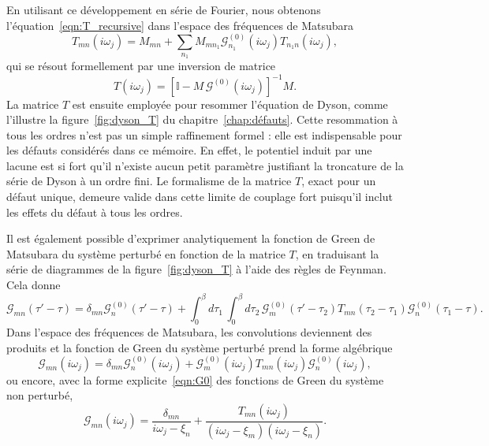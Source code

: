 En utilisant ce développement en série de Fourier, nous obtenons l'équation~\eqref{eqn:T_recursive} dans l'espace des fréquences de Matsubara
\begin{equation}
    T_{mn}(i\omega_j) = M_{mn}+\sum_{n_1}M_{mn_1}\mathcal{G}^{(0)}_{n_1}(i\omega_j)T_{n_1n}(i\omega_j),
    \label{eqn:T_indices}
\end{equation}
qui se résout formellement par une inversion de matrice
\begin{equation}
    T(i\omega_j) = \left[\mathbb{I}-M\,\mathcal{G}^{(0)}(i\omega_j)\right]^{-1}M.
    \label{eqn:T_fermee}
\end{equation}
La matrice $T$ est ensuite employée pour resommer l'équation de Dyson, comme l'illustre la figure~\ref{fig:dyson_T} du chapitre~\ref{chap:défauts}.
Cette resommation à tous les ordres n'est pas un simple raffinement formel : elle est indispensable pour les défauts considérés dans ce mémoire. En effet, le potentiel induit par une lacune est si fort qu'il n'existe aucun petit paramètre justifiant la troncature de la série de Dyson à un ordre fini. Le formalisme de la matrice $T$, exact pour un défaut unique, demeure valide dans cette limite de couplage fort puisqu'il inclut les effets du défaut à tous les ordres.

Il est également possible d'exprimer analytiquement la fonction de Green de Matsubara du système perturbé en fonction de la matrice $T$, en traduisant la série de diagrammes de la figure~\ref{fig:dyson_T} à l'aide des règles de Feynman. Cela donne
\begin{equation}
    \mathcal{G}_{mn}(\tau'-\tau) = \delta_{mn}\mathcal{G}^{(0)}_n(\tau'-\tau) + \int_0^\beta d\tau_1\,\int_0^\beta d\tau_2\,\mathcal{G}^{(0)}_m(\tau'-\tau_2)T_{mn}(\tau_2-\tau_1)\mathcal{G}^{(0)}_n(\tau_1-\tau).
\end{equation}
Dans l'espace des fréquences de Matsubara, les convolutions deviennent des produits et la fonction de Green du système perturbé prend la forme algébrique
\begin{equation}
    \mathcal{G}_{mn}(i\omega_j) =\delta_{mn}\mathcal{G}_n^{(0)}(i\omega_j)+\mathcal{G}^{(0)}_m(i\omega_j)T_{mn}(i\omega_j)\mathcal{G}^{(0)}_n(i\omega_j),
    \label{eqn:G_T}
\end{equation}
ou encore, avec la forme explicite~\eqref{eqn:G0} des fonctions de Green du système non perturbé,
\begin{equation}
    \mathcal{G}_{mn}(i\omega_j) = \frac{\delta_{mn}}{i\omega_j-\xi_n}+\frac{T_{mn}(i\omega_j)}{(i\omega_j-\xi_m)(i\omega_j-\xi_n)}.
    \label{eqn:G_T_explicite}
\end{equation}

